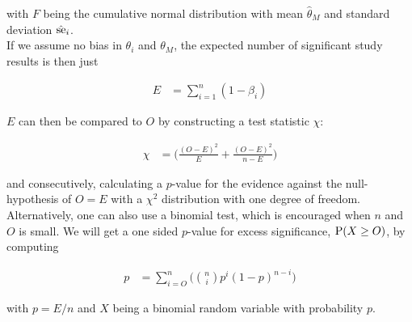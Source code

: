 \documentclass[11pt,a4paper,twoside]{book}\usepackage[]{graphicx}\usepackage[]{color}
\begin{document}
with $F$ being the cumulative normal distribution with mean $\hat{\theta}_M$ and standard deviation $\hat{\se}_i$. \\
If we assume no bias in $\theta_i$ and $\theta_M$, the expected number of significant study results is then just

\begin{align}
E &= \sum_{i = 1}^n (1 - \beta_i) \nonumber
\end{align}

$E$ can then be compared to $O$ by constructing a test statistic $\chi$:

\begin{align}
\chi  &= \bigg( \frac{(O - E)^2}{E} + \frac{(O - E)^2}{n - E}\bigg) \nonumber
\end{align}

and consecutively, calculating a $p$\hspace{0.4mm}-value for the evidence against the null-hypothesis of $O = E$ with a $\chi^2$ distribution with one degree of freedom. Alternatively, one can also use a binomial test, which is encouraged when $n$ and $O$ is small. We will get a one sided $p$\hspace{0.4mm}-value for excess significance, $\P(X \geq O)$, by computing

\begin{align}
p &= \sum_{i = O}^n\Big({n \choose i} p^i (1-p)^{n - i}\Big)
\end{align}

with $p = E/n$ and $X$ being a binomial random variable with probability $p$. 





\end{document}
